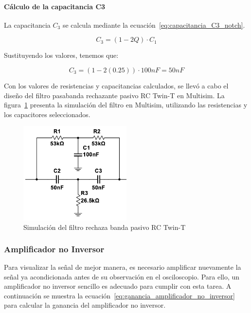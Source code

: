         \paragraph{Cálculo de la capacitancia C3}
        La capacitancia $C_3$ se calcula mediante la ecuación~\ref{eq:capacitancia_C3_notch}.

        \begin{equation}
            \label{eq:capacitancia_C3_notch}
            C_3 = (1 - 2Q) \cdot C_1
        \end{equation}

        Sustituyendo los valores, tenemos que:

        \begin{equation}
            C_3 = (1 - 2(0.25)) \cdot 100 nF = 50 nF
        \end{equation}

        Con los valores de resistencias y capacitancias calculados, se llevó a cabo el diseño del filtro pasabanda rechazante pasivo RC Twin-T en Multisim. La figura~\ref{fig:Simulacion_Filtro_Rechaza_Banda} presenta la simulación del filtro en Multisim, utilizando las resistencias y los capacitores seleccionados.

        \begin{figure}[H]
            \centering
            \includegraphics[width=0.5\textwidth]{img/Desarrollo/multisim_rechazaBandas.png}
            \caption[Simulación del filtro rechaza banda pasivo RC Twin-T.]{Simulación del filtro rechaza banda pasivo RC Twin-T\footnotemark}
            \label{fig:Simulacion_Filtro_Rechaza_Banda}
        \end{figure}

        \subsubsection{Amplificador no Inversor}
        Para visualizar la señal de mejor manera, es necesario amplificar nuevamente la señal ya acondicionada antes de su observación en el osciloscopio. Para ello, un amplificador no inversor sencillo es adecuado para cumplir con esta tarea. A continuación se muestra la ecuación~\ref{eq:ganancia_amplificador_no_inversor} para calcular la ganancia del amplificador no inversor.

